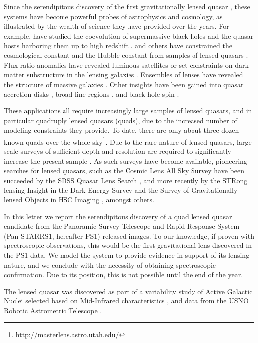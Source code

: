 \documentclass[manuscript]{aastex}
\begin{document}
Since the serendipitous discovery of the first gravitationally lensed quasar \citep{wal79}, these systems have become powerful probes of astrophysics and cosmology, as illustrated by the wealth of science they have provided over the years. For example, \citet{peng06,din17} have studied the coevolution of supermassive black holes and the quasar hosts harboring them up to high redshift \citep{cla02,tre10}. \citet{ogu12,bon17} and others have constrained the cosmological constant and the Hubble constant from samples of lensed quasars \citep[see recent review by][]{Tre16}. Flux ratio anomalies have revealed luminous satellites or set constraints on dark matter substructure in the lensing galaxies \citep[e.g.,][]{chiba05,mck07,fad12}. Ensembles of lenses have revealed the structure of massive galaxies \citep[e.g.,][]{koc00,ogu14}. Other insights have been gained into quasar accretion disks \citep[e.g.,][]{dai10}, broad-line regions \citep[e.g.,][]{slu12}, and black hole spin \citep{reis14}.

These applications all require increasingly large samples of lensed quasars, and in particular quadruply lensed quasars (quads), due to the increased number of modeling constraints they provide. To date, there are only about three dozen known quads over the whole sky\footnote{http://masterlens.astro.utah.edu/}. Due to the rare nature of lensed quasars, large scale surveys of sufficient depth and resolution are required to significantly increase the present sample \citep{ogu10}. As such surveys have become available, pioneering searches for lensed quasars, such as the Cosmic Lens All Sky Survey \citep[CLASS;][]{mye03} have been succeeded by the SDSS Quasar Lens Search \citep[SQLS;][]{ogu06}, and more recently by the STRong lensing Insight in the Dark Energy Survey \citep[STRIDES;][]{agn15} and the Survey of Gravitationally-lensed Objects in HSC Imaging \citep[SuGOHI;][]{son17}, amongst others.

In this letter we report the serendipitous discovery of a quad lensed quasar candidate from the Panoramic Survey Telescope and Rapid Response System (Pan-STARRS1, hereafter PS1) released images. To our knowledge, if proven with spectroscopic observations, this would be the first gravitational lens discovered in the PS1 data. We model the system to provide evidence in support of its lensing nature, and we conclude with the necessity of obtaining spectroscopic confirmation. Due to its position, this is not possible until the end of the year.

The lensed quasar was discovered as part of a variability study of Active Galactic Nuclei selected based on Mid-Infrared characteristics \citep{sec01}, and data from the USNO Robotic Astrometric Telescope \citep{zac15}. 
\end{document}
